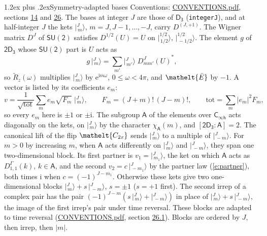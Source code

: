 \documentclass[10pt,a4paper]{article}
\makeatletter
\renewcommand\section{\@startsection{section}{1}{\z@}{-3ex plus -1ex minus -.2ex}%
  {1.2ex plus .2ex}{\normalfont\large\sffamily\bfseries\color{parttitle}}}
\numberwithin{equation}{section}
\newcommand{\eltfont}[1]{{\let\sigma\eltsigma\mathelt{#1}}}
\newcommand{\grp}[1]{\mathsf{#1}}
\newcommand{\elt}[1]{\eltfont{#1}}
\newcommand{\grpindex}[2]{[#1 : #2]}
\newcommand{\iunit}{\mathrm{i}}
\newcommand{\expe}{\mathrm{e}}
\newcommand{\irrJp}[2]{D^{(#1,#2)}}
\newcommand{\repD}[1]{D^{#1}}
\newcommand{\wignerD}[1]{D^{#1}}
\newcommand{\chiA}{\chi_{\grp{A}}}
\newcommand{\conj}[1]{{#1}^{*}}
\newcommand{\jm}[2]{\bigl\lvert{}^{#1}_{\,#2}\bigr\rangle}
\newcommand{\barred}[1]{\bar{#1}}
\newcommand{\lift}[1]{\tilde{#1}}
\makeatother
\begin{document}
\section{Symmetry-adapted bases}\label{s:bases}
Conventions: \href{../../CONVENTIONS.pdf}{CONVENTIONS.pdf}, sections \href{../../../rotation/CONVENTIONS.pdf\#conv.14}{14} and \href{../../CONVENTIONS.pdf\#conv.26}{26}.
\leavevmode\label{n:index.m}\label{n:vector.ket}The bases at integer $J$ are those of \href{../../../rotation/data/pdf/D3.pdf}{$\grp{D_{3}}$} (\texttt{integerJ}), and at half-integer $J$ the kets $\jm{J}{m}$, $m = J, J-1, \dots, -J$, carry $\irrJp{J}{+1}$. \label{n:matrix.wigner}The Wigner matrix $\wignerD{J}$ of $\grp{SU(2)}$ satisfies $\wignerD{1/2}(U) = U$ on $\jm{1/2}{1/2}$, $\jm{1/2}{-1/2}$. The element $g$ of $\grp{2D_{3}}$ whose $\grp{SU(2)}$ part is $U$ acts as
\begin{equation}\label{e:action}g\,\jm{J}{m} = \sum_{m'} \jm{J}{m'}\; \conj{\wignerD{J}_{m m'}(U)},\end{equation}
so $\lift{R}_{z}(\omega)$ multiplies $\jm{J}{m}$ by $\expe^{\iunit m\omega}$, $0 \le \omega < 4\pi$, and $\elt{\barred{E}}$ by $-1$. \label{n:index.ketcoefficient}\label{n:vector.basis.symmetry}\label{n:index.ketweight}\label{n:index.total}A vector is listed by its coefficients $e_m$:
\begin{equation}\label{e:ket}v = \frac{1}{\sqrt{\mathrm{tot}}}\sum_m e_m\sqrt{F_m}\;\jm{J}{m},\qquad F_m = (J+m)!\,(J-m)!,\qquad \mathrm{tot} = \sum_m |e_m|^2F_m,\end{equation}
so every $e_m$ here is $\pm 1$ or $\pm\iunit$.
\leavevmode\label{n:group.A}\label{n:function.character.abelian}The subgroup $\grp{A}$ of the elements over $\grp{C_{\infty h}}$ acts diagonally on the kets, on $\jm{J}{m}$ by the character $\chiA(m)$, and $\grpindex{\grp{2D_{3}}}{\grp{A}} = 2$. The canonical lift of the flip $\elt{C_{2x}}$ sends $\jm{J}{m}$ to a multiple of $\jm{J}{-m}$. For $m > 0$ by increasing $m$, when $\grp{A}$ acts differently on $\jm{J}{m}$ and $\jm{J}{-m}$, they span one two-dimensional block. \label{n:index.partner.sign}Its first partner is $v_1 = \jm{J}{m_1}$, the ket on which $\grp{A}$ acts as $\repD{\Gamma}_{1,1}(k)$, $k \in \grp{A}$, and the second $v_2 = c\,\jm{J}{-m_1}$ by the partner law (\ref{e:partner}), both times $\iunit$ when $c = (-1)^{J-m_1}$. \label{n:index.pair.sign}Otherwise these kets give two one-dimensional blocks $\jm{J}{m} + s\,\jm{J}{-m}$, $s = \pm 1$ ($s = +1$ first). The second irrep of a complex pair has the pair $(-1)^{J-m}(s\,\jm{J}{m} + \jm{J}{-m})$ in place of $\jm{J}{m} + s\,\jm{J}{-m}$, the image of the first irrep's pair under time reversal. These blocks are adapted to time reversal (\href{../../CONVENTIONS.pdf}{CONVENTIONS.pdf}, section \href{../../CONVENTIONS.pdf\#conv.26.1}{26.1}). Blocks are ordered by $J$, then irrep, then $|m|$.
\end{document}
